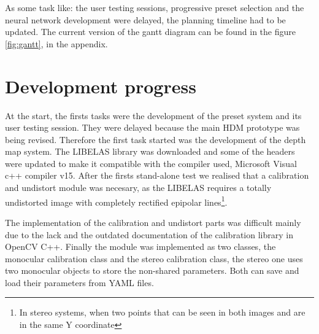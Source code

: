 \documentclass[10pt,a4paper,twocolumn,twoside]{article}
\begin{document}
	

	As some task like: the user testing sessions, progressive preset selection and the neural network development were delayed, the planning timeline had to be updated. The current version of the gantt diagram can be found in the figure \ref{fig:gantt}, in the appendix.
	
	\section{Development progress}
	
	At the start, the firsts tasks were the development of the preset system and its user testing session. They were delayed because the main HDM prototype was being revised. Therefore the first task started was the development of the depth map system. The LIBELAS library was downloaded and some of the headers were updated to make it compatible with the compiler used, Microsoft Visual c++ compiler v15. After the firsts stand-alone test we realised that a calibration and undistort module was necesary, as the LIBELAS requires a totally undistorted image with completely rectified epipolar lines\footnote{In stereo systems, when two points that can be seen in both images and are in the same Y coordinate}. 
	
	The implementation of the calibration and undistort parts was difficult mainly due to the lack and the outdated documentation of the calibration library in OpenCV C++. Finally the module was implemented as two classes, the monocular calibration class and the stereo calibration class, the stereo one uses two monocular objects to store the non-shared parameters. Both can save and load their parameters from YAML files.
	
\end{document}
